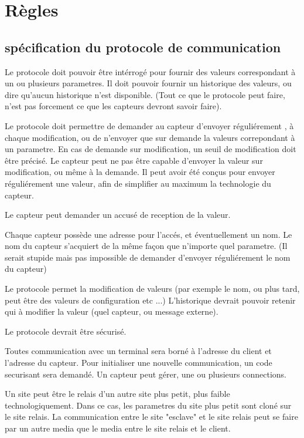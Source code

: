 \section{Règles}
    \subsection{spécification du protocole de communication}

        Le protocole doit pouvoir être intérrogé pour fournir des valeurs correspondant à un ou plusieurs parametres.
        Il doit pouvoir fournir un historique des valeurs, ou dire qu'aucun historique n'est disponible.
        (Tout ce que le protocole peut faire, n'est pas forcement ce que les capteurs devront savoir faire).

        Le protocole doit permettre de demander au capteur d'envoyer réguliérement , à chaque modification, ou de n'envoyer que sur demande la valeurs correpondant à un parametre.
        En cas de demande sur modification, un seuil de modification doit être précisé.
        Le capteur peut ne pas être capable d'envoyer la valeur sur modification, ou même à la demande.
        Il peut avoir été conçus pour envoyer réguliérement une valeur, afin de simplifier au maximum la technologie du capteur.

        Le capteur peut demander un accusé de reception de la valeur.

        Chaque capteur possède une adresse pour l'accés, et éventuellement un nom.
        Le nom du capteur s'acquiert de la même façon que n'importe quel parametre.
        (Il serait stupide mais pas impossible de demander d'envoyer réguliérement le nom du capteur)

        Le protocole permet la modification de valeurs (par exemple le nom, ou plus tard, peut être des valeurs de configuration etc ...)
        L'historique devrait pouvoir retenir qui à modifier la valeur (quel capteur, ou message externe).

        Le protocole devrait être sécurisé.

        Toutes communication avec un terminal sera borné à l'adresse du client et l'adresse du capteur.
        Pour initialiser une nouvelle communication, un code securisant sera demandé.
        Un capteur peut gérer, une ou plusieurs connections.

        Un site peut être le relais d'un autre site plus petit, plus faible technologiquement.
        Dans ce cas, les parametres du site plus petit sont cloné sur le site relais.
        La communication entre le site "esclave" et le site relais peut se faire par un autre media que le media entre le site relais et le client.

